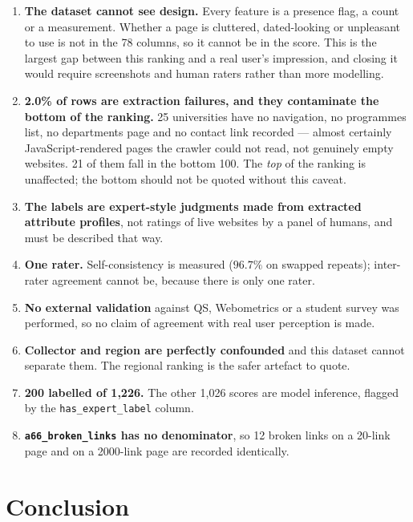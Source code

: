 \documentclass[11pt,a4paper]{article}
\begin{document}
\begin{enumerate}
\item \textbf{The dataset cannot see design.} Every feature is a presence flag, a count or a
      measurement. Whether a page is cluttered, dated-looking or unpleasant to use is not in
      the 78 columns, so it cannot be in the score. This is the largest gap between this
      ranking and a real user's impression, and closing it would require screenshots and human
      raters rather than more modelling.
\item \textbf{2.0\% of rows are extraction failures, and they contaminate the bottom of the
      ranking.} 25 universities have no navigation, no programmes list, no departments page
      and no contact link recorded --- almost certainly JavaScript-rendered pages the crawler
      could not read, not genuinely empty websites. 21 of them fall in the bottom 100. The
      \emph{top} of the ranking is unaffected; the bottom should not be quoted without this
      caveat.
\item \textbf{The labels are expert-style judgments made from extracted attribute profiles},
      not ratings of live websites by a panel of humans, and must be described that way.
\item \textbf{One rater.} Self-consistency is measured ($96.7\%$ on swapped repeats);
      inter-rater agreement cannot be, because there is only one rater.
\item \textbf{No external validation} against QS, Webometrics or a student survey was
      performed, so no claim of agreement with real user perception is made.
\item \textbf{Collector and region are perfectly confounded} and this dataset cannot separate
      them. The regional ranking is the safer artefact to quote.
\item \textbf{200 labelled of 1{,}226.} The other 1{,}026 scores are model inference, flagged
      by the \texttt{has\_expert\_label} column.
\item \textbf{\texttt{a66\_broken\_links} has no denominator}, so 12 broken links on a
      20-link page and on a 2000-link page are recorded identically.
\end{enumerate}

\section{Conclusion}
\end{document}
